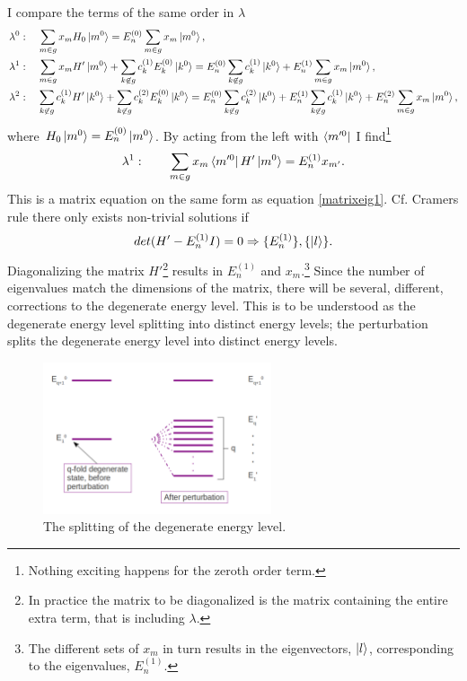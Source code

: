 I compare the terms of the same order in $\lambda$
\begin{equation}
	\begin{split}
		&\lambda^0:\quad \sum_{m\in g}x_mH_0\ket{m^0}=E_n^{(0)}\sum_{m\in g}x_m\ket{m^0},\\
		&\lambda^1:\quad \sum_{m\in g}x_mH'\ket{m^0}+\sum_{k\not\in g}c_k^{(1)}E_k^{(0)}\ket{k^0}=E_n^{(0)}\sum_{k\not\in g}c_k^{(1)}\ket{k^0}+E_n^{(1)}\sum_{m\in g}x_m\ket{m^0},\\
		&\lambda^2:\quad \sum_{k\not\in g}c_k^{(1)}H'\ket{k^0}+\sum_{k\not\in g}c_k^{(2)}E_k^{(0)}\ket{k^0}
		=E_n^{(0)}\sum_{k\not\in g}c_k^{(2)}\ket{k^0}+E_n^{(1)}\sum_{k\not\in g}c_k^{(1)}\ket{k^0}+E_n^{(2)}\sum_{m\in g}x_m\ket{m^0},
	\end{split}
\end{equation} 
where $H_0\ket{m^0}=E_n^{(0)}\ket{m^0}$. By acting from the left with $\bra{m'^0}$ I find\footnote{Nothing exciting happens for the zeroth order term.}
\begin{equation}
	\lambda^1:\qquad \sum_{m\in g}x_m\bra{m'^0}H'\ket{m^0}=E_n^{(1)}x_{m'}.
\end{equation} 
This is a matrix equation on the same form as equation \eqref{matrixeig1}. Cf. Cramers rule there only exists non-trivial solutions if
\begin{equation}
	det(H'-E_n^{(1)}I)=0 \Rightarrow \{E_n^{(1)}\}, \{\ket{l}\}.
\end{equation} 
Diagonalizing the matrix $H'$\footnote{In practice the matrix to be diagonalized is the matrix containing the entire extra term, that is including $\lambda$.} results in $E_n^{(1)}$ and $x_m$.\footnote{The different sets of $x_m$ in turn results in the eigenvectors, $\ket{l}$, corresponding to the eigenvalues, $E_n^{(1)}$.} Since the number of eigenvalues match the dimensions of the matrix, there will be several, different, corrections to the degenerate energy level. This is to be understood as the degenerate energy level splitting into distinct energy levels; the perturbation splits the degenerate energy level into distinct energy levels.  
\begin{figure}[ht]
	\captionsetup{width=1\textwidth}
	\centering
	\includegraphics[width=0.6\textwidth]{figures/degpert}
	\caption{The splitting of the degenerate energy level.}
	\label{fig:degpert}
\end{figure}
